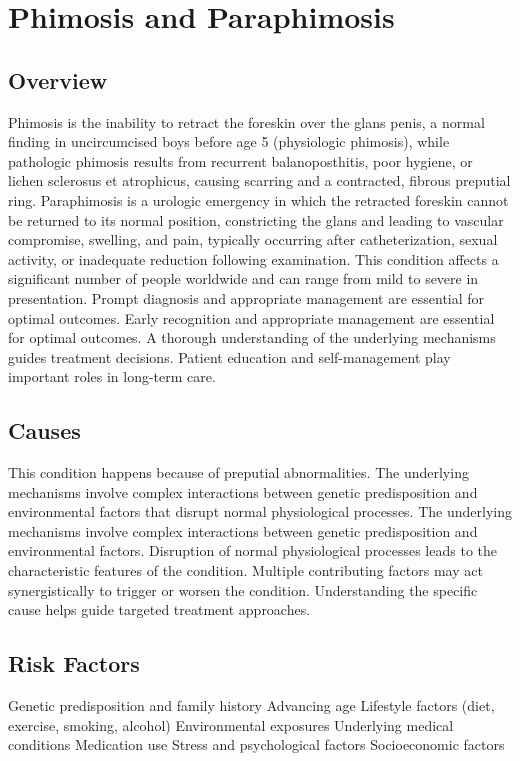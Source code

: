 \chapter{Phimosis and Paraphimosis}
\label{sec:Phimosis and Paraphimosis}

\section{Overview}
Phimosis is the inability to retract the foreskin over the glans penis, a normal finding in uncircumcised boys before age 5 (physiologic phimosis), while pathologic phimosis results from recurrent balanoposthitis, poor hygiene, or lichen sclerosus et atrophicus, causing scarring and a contracted, fibrous preputial ring. Paraphimosis is a urologic emergency in which the retracted foreskin cannot be returned to its normal position, constricting the glans and leading to vascular compromise, swelling, and pain, typically occurring after catheterization, sexual activity, or inadequate reduction following examination. This condition affects a significant number of people worldwide and can range from mild to severe in presentation. Prompt diagnosis and appropriate management are essential for optimal outcomes. Early recognition and appropriate management are essential for optimal outcomes. A thorough understanding of the underlying mechanisms guides treatment decisions. Patient education and self-management play important roles in long-term care.
\section{Causes}
This condition happens because of preputial abnormalities. The underlying mechanisms involve complex interactions between genetic predisposition and environmental factors that disrupt normal physiological processes. The underlying mechanisms involve complex interactions between genetic predisposition and environmental factors. Disruption of normal physiological processes leads to the characteristic features of the condition. Multiple contributing factors may act synergistically to trigger or worsen the condition. Understanding the specific cause helps guide targeted treatment approaches.
\section{Risk Factors}
Genetic predisposition and family history Advancing age Lifestyle factors (diet, exercise, smoking, alcohol) Environmental exposures Underlying medical conditions Medication use Stress and psychological factors Socioeconomic factors

